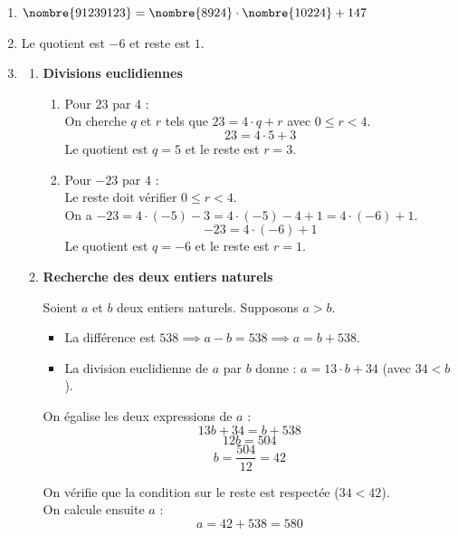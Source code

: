 \begin{center}
\end{center}

\everymath{\textstyle}
\begin{enumerate}[label=\thechapter.\arabic*, font=\bfseries, itemsep=7mm,labelsep*=3mm,left=0mm]
\item 
$\nombre{91239123}=\nombre{8924}\cdot \nombre{10224}+147$



\item
Le quotient est $-6$ et reste est $1$.

\item 


\begin{enumerate}[label=\alph*),itemsep=0mm,left=0mm]
	\item  \textbf{Divisions euclidiennes}
	\begin{enumerate}
		\item[\textbf{1)}] Pour $23$ par $4$ : \\
		On cherche $q$ et $r$ tels que $23 = 4 \cdot q + r$ avec $0 \le r < 4$. \\
		$$23 = 4 \cdot 5 + 3$$
		Le quotient est $q = 5$ et le reste est $r = 3$.
		
		\item[\textbf{2)}] Pour $-23$ par $4$ : \\
		Le reste doit vérifier $0 \le r < 4$. \\
		On a $-23 = 4 \cdot (-5) - 3 = 4 \cdot (-5) - 4 + 1 = 4 \cdot (-6) + 1$.
		$$-23 = 4 \cdot (-6) + 1$$
		Le quotient est $q = -6$ et le reste est $r = 1$.
	\end{enumerate}
	
	\item  \textbf{Recherche des deux entiers naturels}
	
	Soient $a$ et $b$ deux entiers naturels. Supposons $a > b$.
	\begin{itemize}
		\item La différence est $538 \implies a - b = 538 \implies a = b + 538$.
		\item La division euclidienne de $a$ par $b$ donne : $a = 13 \cdot b + 34$ (avec $34 < b$).
	\end{itemize}
	
	On égalise les deux expressions de $a$ :
	$$13b + 34 = b + 538$$
	$$12b = 504$$
	$$b = \frac{504}{12} = 42$$
	
	On vérifie que la condition sur le reste est respectée ($34 < 42$). \\
	On calcule ensuite $a$ :
	$$a = 42 + 538 = 580$$
	

\end{enumerate}
\end{enumerate}
